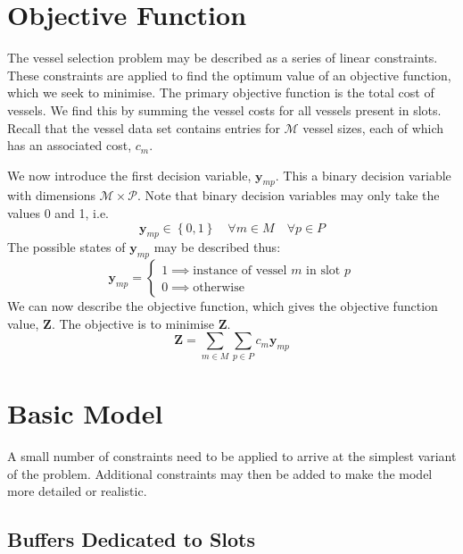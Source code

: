 \section{Objective Function}\label{S.objfn}

The vessel selection problem may be described as a series of linear
constraints.
These constraints are applied to find the optimum value of an objective
function, which we seek to minimise.
The primary objective function is the total cost of vessels.
We find this by summing the vessel costs for all vessels present in slots.
Recall that the vessel data set contains entries for $\mathcal{M}$ vessel
sizes, each of which has an associated cost, $c_{m}$.

We now introduce the first decision variable, $\boldsymbol{y}_{mp}$.
This a binary decision variable with dimensions
$\mathcal{M} \times \mathcal{P}$.
Note that binary decision variables may only take the values 0 and 1, i.e.
\begin{equation}
    \boldsymbol{y}_{mp} \in \left\{ 0, 1 \right\} \quad \forall m \in M \quad
    \forall p \in P
    \label{eq.y}
\end{equation}
The possible states of $\boldsymbol{y}_{mp}$ may be described thus:
\begin{equation}
    \boldsymbol{y}_{mp} =
    \begin{cases}
        1 \implies \text{instance of vessel $m$ in slot $p$}\\
        0 \implies \text{otherwise}
    \end{cases}
\end{equation}
We can now describe the objective function, which gives the objective function
value, $\boldsymbol{Z}$.  The objective is to minimise $\boldsymbol{Z}$.
\begin{equation}
    \boldsymbol{Z} = \sum_{m \in M} \sum_{p \in P} c_m \boldsymbol{y}_{mp}
    \label{eq.objfn}
\end{equation}

\section{Basic Model}\label{S.basicprob}

A small number of constraints need to be applied to arrive at the simplest
variant of the problem.
Additional constraints may then be added to make the model more detailed or
realistic.

\subsection{Buffers Dedicated to Slots}\label{SS.constr1}

